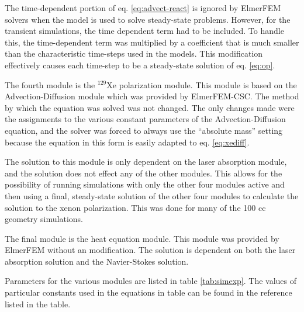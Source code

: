 The time-dependent portion of eq. \ref{eq:advect-react} is ignored by ElmerFEM solvers when the model is used to solve steady-state problems. However, for the transient simulations, the time dependent term had to be included. To handle this, the time-dependent term was multiplied by a coefficient that is much smaller than the characteristic time-steps used in the models. This modification effectively causes each time-step to be a steady-state solution of eq. \ref{eq:op}.

The fourth module is the $^{129}$Xe polarization module. This module is based on the Advection-Diffusion module which was provided by ElmerFEM-CSC. The method by which the equation was solved was not changed. The only changes made were the assignments to the various constant parameters of the Advection-Diffusion equation, and the solver was forced to always use the ``absolute mass'' setting because the equation in this form is easily adapted to eq. \ref{eq:xediff}. 

The solution to this module is only dependent on the laser absorption module, and the solution does not effect any of the other modules. This allows for the possibility of running simulations with only the other four modules active and then using a final, steady-state solution of the other four modules to calculate the solution to the xenon polarization. This was done for many of the 100 cc geometry simulations. 

The final module is the heat equation module. This module was provided by ElmerFEM without an modification. The solution is dependent on both the laser absorption solution and the Navier-Stokes solution.

Parameters for the various modules are listed in table \ref{tab:simexp}. The values of particular constants used in the equations in table can be found in the reference listed in the table.

